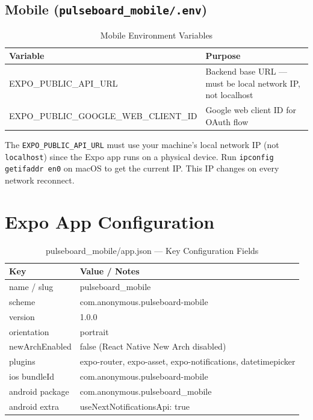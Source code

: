 \documentclass[12pt,a4paper]{report}
\newenvironment{warnbox}[1]{%
  \begin{tcolorbox}[
    enhanced, breakable,
    colback  = number!8,
    colframe = number!60,
    fonttitle= \bfseries\small,
    title    = {#1},
    left=6pt, right=6pt, top=4pt, bottom=4pt
  ]
}{%
  \end{tcolorbox}
}
\newcommand{\code}[1]{\texttt{\small\color{type}#1}}
\begin{document}
\subsection{Mobile (\texttt{pulseboard\_mobile/.env})}

\begin{table}[H]
\centering
{}
\begin{tabularx}{\textwidth}{>{\ttfamily\small}l X}
\rowcolor{tableheadbg}
\color{white}\normalfont Variable & \color{white}Purpose \\
\toprule
EXPO\_PUBLIC\_API\_URL            & Backend base URL — must be local network IP, not localhost \\
EXPO\_PUBLIC\_GOOGLE\_WEB\_CLIENT\_ID & Google web client ID for OAuth flow \\
\bottomrule
\end{tabularx}
\caption{Mobile Environment Variables}
\end{table}

\begin{warnbox}{Local Development Note}
The \code{EXPO\_PUBLIC\_API\_URL} must use your machine's local network IP (not \texttt{localhost}) since the Expo app runs on a physical device. Run \texttt{ipconfig getifaddr en0} on macOS to get the current IP. This IP changes on every network reconnect.
\end{warnbox}

\section{Expo App Configuration}

\begin{table}[H]
\centering
{}
\begin{tabularx}{\textwidth}{>{\ttfamily\small}l X}
\rowcolor{tableheadbg}
\color{white}\normalfont Key & \color{white}Value / Notes \\
\toprule
name / slug        & pulseboard\_mobile \\
scheme             & com.anonymous.pulseboard-mobile \\
version            & 1.0.0 \\
orientation        & portrait \\
newArchEnabled     & false (React Native New Arch disabled) \\
plugins            & expo-router, expo-asset, expo-notifications, datetimepicker \\
ios bundleId       & com.anonymous.pulseboard-mobile \\
android package    & com.anonymous.pulseboard\_mobile \\
android extra      & useNextNotificationsApi: true \\
\bottomrule
\end{tabularx}
\caption{pulseboard\_mobile/app.json — Key Configuration Fields}
\end{table}
\end{document}
